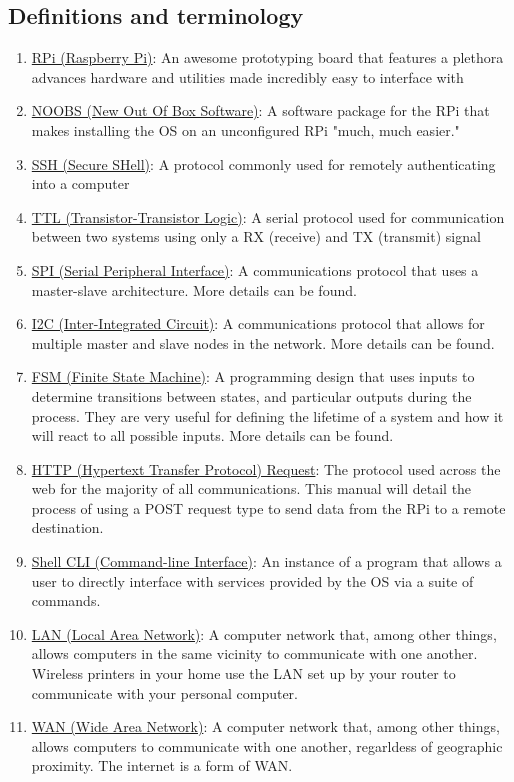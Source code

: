 \documentclass{article}
\newcommand{\createterm}[3]{
      \item \href{#1}{#2}: #3
} %
\begin{document}
  \subsection{Definitions and terminology}
    \begin{enumerate}
      \createterm{https://en.wikipedia.org/wiki/Raspberry\_Pi}{RPi (Raspberry Pi)}{An awesome prototyping board that features a plethora advances hardware and utilities made incredibly easy to interface with}
      \createterm{https://www.raspberrypi.org/blog/introducing-noobs/}{NOOBS (New Out Of Box Software)}{A software package for the RPi that makes installing the OS on an unconfigured RPi "much, much easier."}
      \createterm{https://en.wikipedia.org/wiki/Secure\_Shell}{SSH (Secure SHell)}{A protocol commonly used for remotely authenticating into a computer}
      \createterm{https://en.wikipedia.org/wiki/Transistor\%E2\%80\%93transistor\_logic}{TTL (Transistor-Transistor Logic)}{A serial protocol used for communication between two systems using only a RX (receive) and TX (transmit) signal}
      \createterm{https://en.wikipedia.org/wiki/Serial\_Peripheral\_Interface\_Bus}{SPI (Serial Peripheral Interface)}{A communications protocol that uses a master-slave architecture. More details can be found.}
      \createterm{https://en.wikipedia.org/wiki/I\%C2\%B2C}{I2C (Inter-Integrated Circuit)}{A communications protocol that allows for multiple master and slave nodes in the network. More details can be found.}
      \createterm{https://en.wikipedia.org/wiki/Finite-state\_machine}{FSM (Finite State Machine)}{A programming design that uses inputs to determine transitions between states, and particular outputs during the process. They are very useful for defining the lifetime of a system and how it will react to all possible inputs. More details can be found.}
      \createterm{https://en.wikipedia.org/wiki/Hypertext\_Transfer\_Protocol\#Request\_methods}{HTTP (Hypertext Transfer Protocol) Request}{The protocol used across the web for the majority of all communications. This manual will detail the process of using a POST request type to send data from the RPi to a remote destination.}
      \createterm{https://en.wikipedia.org/wiki/Command-line\_interface}{Shell CLI (Command-line Interface)}{An instance of a program that allows a user to directly interface with services provided by the OS via a suite of commands.}
      \createterm{https://en.wikipedia.org/wiki/Local\_area\_network}{LAN (Local Area Network)}{A computer network that, among other things, allows computers in the same vicinity to communicate with one another. Wireless printers in your home use the LAN set up by your router to communicate with your personal computer.}
      \createterm{https://en.wikipedia.org/wiki/Wide\_area\_network}{WAN (Wide Area Network)}{A computer network that, among other things, allows computers to communicate with one another, regarldess of geographic proximity. The internet is a form of WAN.}
    \end{enumerate}
\end{document}
